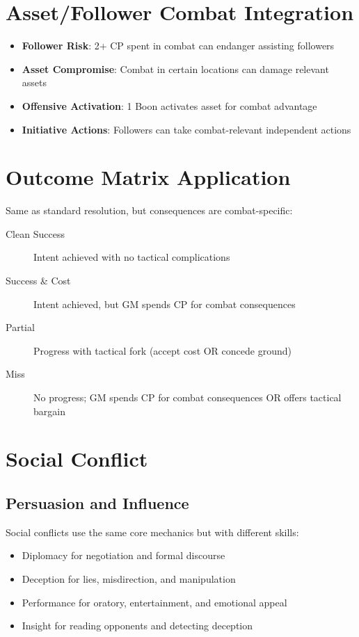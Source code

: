 \section{Asset/Follower Combat Integration}
\begin{itemize}
    \item \textbf{Follower Risk}: 2+ CP spent in combat can endanger assisting followers
    \item \textbf{Asset Compromise}: Combat in certain locations can damage relevant assets  
    \item \textbf{Offensive Activation}: 1 Boon activates asset for combat advantage
    \item \textbf{Initiative Actions}: Followers can take combat-relevant independent actions
\end{itemize}

\section{Outcome Matrix Application}
Same as standard resolution, but consequences are combat-specific:
\begin{description}
\item[Clean Success] Intent achieved with no tactical complications
\item[Success \& Cost] Intent achieved, but GM spends CP for combat consequences
\item[Partial] Progress with tactical fork (accept cost OR concede ground)
\item[Miss] No progress; GM spends CP for combat consequences OR offers tactical bargain
\end{description}

\section{Social Conflict}

\subsection{Persuasion and Influence}

Social conflicts use the same core mechanics but with different skills:
\begin{itemize}
\item Diplomacy for negotiation and formal discourse
\item Deception for lies, misdirection, and manipulation
\item Performance for oratory, entertainment, and emotional appeal
\item Insight for reading opponents and detecting deception
\end{itemize}

